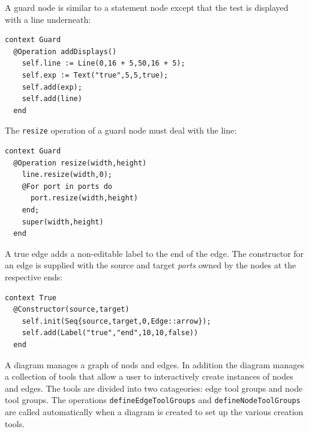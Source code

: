 \documentclass{article}
\begin{document}
A guard node is similar to a statement node except that the test is displayed with a 
line underneath:
\begin{verbatim}
context Guard
  @Operation addDisplays()
    self.line := Line(0,16 + 5,50,16 + 5);
    self.exp := Text("true",5,5,true);
    self.add(exp);
    self.add(line)
  end
\end{verbatim}
The {\tt resize} operation of a guard node must deal with the line:
\begin{verbatim}
context Guard
  @Operation resize(width,height)
    line.resize(width,0);
    @For port in ports do
      port.resize(width,height)
    end;
    super(width,height)
  end
\end{verbatim}
A true edge adds a non-editable label to the end of the edge. The constructor for an edge is
supplied with the source and target {\em ports} owned by the nodes at the respective
ends:
\begin{verbatim}
context True
  @Constructor(source,target) 
    self.init(Seq{source,target,0,Edge::arrow});
    self.add(Label("true","end",10,10,false))
  end
\end{verbatim}
A diagram manages a graph of nods and edges. In addition the diagram manages a collection
of tools that allow a user to interactively create instances of nodes and edges. The
tools are divided into two catageories: edge tool groups and node tool groups. The
operations {\tt defineEdgeToolGroups} and {\tt defineNodeToolGroups} are called automatically
when a diagram is created to set up the various creation tools.
\end{document}
